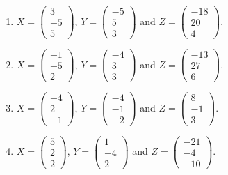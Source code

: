 \begin{enumerate}[label=\arabic*.,  leftmargin=*]
\item $X = \begin{pmatrix} 3 \\ -5 \\ 5 \end{pmatrix}$, $Y = \begin{pmatrix} -5 \\ 5 \\ 3 \end{pmatrix}$ and $Z = \begin{pmatrix} -18 \\ 20 \\ 4 \end{pmatrix}$.
\item $X = \begin{pmatrix} -1 \\ -5 \\ 2 \end{pmatrix}$, $Y = \begin{pmatrix} -4 \\ 3 \\ 3 \end{pmatrix}$ and $Z = \begin{pmatrix} -13 \\ 27 \\ 6 \end{pmatrix}$.
\item $X = \begin{pmatrix} -4 \\ 2 \\ -1 \end{pmatrix}$, $Y = \begin{pmatrix} -4 \\ -1 \\ -2 \end{pmatrix}$ and $Z = \begin{pmatrix} 8 \\ -1 \\ 3 \end{pmatrix}$.
\item $X = \begin{pmatrix} 5 \\ 2 \\ 2 \end{pmatrix}$, $Y = \begin{pmatrix} 1 \\ -4 \\ 2 \end{pmatrix}$ and $Z = \begin{pmatrix} -21 \\ -4 \\ -10 \end{pmatrix}$.

\end{enumerate}
